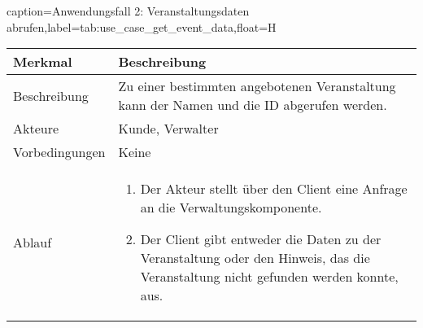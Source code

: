 \begin{dhbwtable}{caption=Anwendungsfall 2: Veranstaltungsdaten abrufen,label=tab:use_case_get_event_data,float=H}
    \begin{tabularx}{\textwidth}{lX}
        \toprule
        \textbf{Merkmal} & \textbf{Beschreibung}  \\ \midrule
        Beschreibung    & Zu einer bestimmten angebotenen Veranstaltung kann der Namen und die ID abgerufen werden. \\
        Akteure         & Kunde, Verwalter \\
        Vorbedingungen  & Keine \\
        Ablauf          & \begin{enumerate}
            \item Der Akteur stellt über den Client eine Anfrage an die Verwaltungskomponente.
            \item Der Client gibt entweder die Daten zu der Veranstaltung oder den Hinweis, das die Veranstaltung nicht gefunden werden konnte, aus.
        \end{enumerate} \\\bottomrule
    \end{tabularx}    
\end{dhbwtable}

